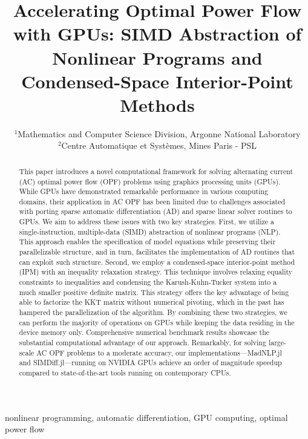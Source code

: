 
\title{Accelerating Optimal Power Flow with GPUs: SIMD Abstraction of Nonlinear Programs and Condensed-Space Interior-Point Methods 
}

\date{\small
  $^{1}$Mathematics and Computer Science Division, Argonne National Laboratory\\
  $^{2}$Centre Automatique et Syst\`{e}mes, Mines Paris - PSL
}

\maketitle
\begin{abstract}
  This paper introduces a novel computational framework for solving
alternating current (AC) optimal power flow (OPF) problems using
graphics processing units (GPUs). While GPUs have demonstrated
remarkable performance in various computing domains, their application
in AC OPF has been limited due to challenges associated with porting
sparse automatic differentiation (AD) and sparse linear solver
routines to GPUs. We aim to address these issues with two key
strategies.  First, we utilize a single-instruction, multiple-data
(SIMD) abstraction of nonlinear programs (NLP). This approach enables
the specification of model equations while preserving their
parallelizable structure, and in turn, facilitates the implementation
of AD routines that can exploit such structure.  Second, we employ a
condensed-space interior-point method (IPM) with an inequality
relaxation strategy. This technique involves relaxing equality
constraints to inequalities and condensing the Karush-Kuhn-Tucker
system into a much smaller positive definite matrix. This strategy
offers the key advantage of being able to factorize the KKT matrix
without numerical pivoting, which in the past has hampered the parallelization of
the algorithm.  By combining these two strategies, we can perform the
majority of operations on GPUs while keeping the data residing in the
device memory only. Comprehensive numerical benchmark results showcase
the substantial computational advantage of our approach. Remarkably,
for solving large-scale AC OPF problems to a moderate accuracy, our
implementations—MadNLP.jl and SIMDiff.jl—running on NVIDIA GPUs
achieve an order of magnitude speedup compared to state-of-the-art
tools running on contemporary CPUs.
\end{abstract}

\begin{IEEEkeywords}
  nonlinear programming, automatic differentiation, GPU computing, optimal power flow
\end{IEEEkeywords}
